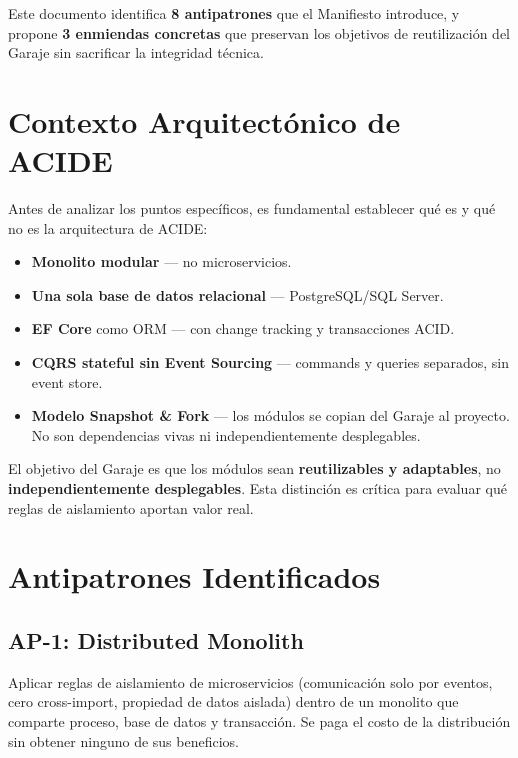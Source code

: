 \documentclass[12pt,a4paper]{article}
\begin{document}
Este documento identifica \textbf{8 antipatrones} que el Manifiesto introduce, y propone \textbf{3 enmiendas concretas} que preservan los objetivos de reutilizaci\'on del Garaje sin sacrificar la integridad t\'ecnica.


\section{Contexto Arquitect\'onico de ACIDE}

Antes de analizar los puntos espec\'ificos, es fundamental establecer qu\'e es y qu\'e no es la arquitectura de ACIDE:

\begin{itemize}[leftmargin=2em]
    \item \textbf{Monolito modular} --- no microservicios.
    \item \textbf{Una sola base de datos relacional} --- PostgreSQL/SQL Server.
    \item \textbf{EF Core} como ORM --- con change tracking y transacciones ACID.
    \item \textbf{CQRS stateful sin Event Sourcing} --- commands y queries separados, sin event store.
    \item \textbf{Modelo Snapshot \& Fork} --- los m\'odulos se copian del Garaje al proyecto. No son dependencias vivas ni independientemente desplegables.
\end{itemize}

El objetivo del Garaje es que los m\'odulos sean \textbf{reutilizables y adaptables}, no \textbf{independientemente desplegables}. Esta distinci\'on es cr\'itica para evaluar qu\'e reglas de aislamiento aportan valor real.


\section{Antipatrones Identificados}

\subsection{AP-1: Distributed Monolith}
Aplicar reglas de aislamiento de microservicios (comunicaci\'on solo por eventos, cero cross-import, propiedad de datos aislada) dentro de un monolito que comparte proceso, base de datos y transacci\'on. Se paga el costo de la distribuci\'on sin obtener ninguno de sus beneficios.
\end{document}
